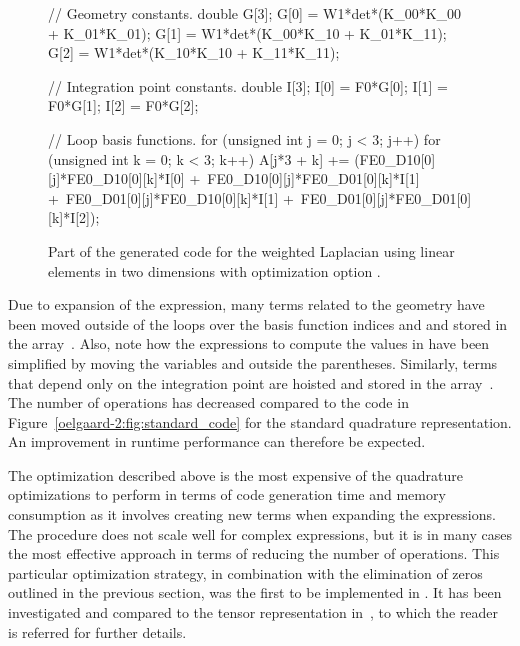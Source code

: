 \begin{figure}
\begin{c++}
// Geometry constants.
double G[3];
G[0] = W1*det*(K_00*K_00 + K_01*K_01);
G[1] = W1*det*(K_00*K_10 + K_01*K_11);
G[2] = W1*det*(K_10*K_10 + K_11*K_11);

// Integration point constants.
double I[3];
I[0] = F0*G[0];
I[1] = F0*G[1];
I[2] = F0*G[2];

// Loop basis functions.
for (unsigned int j = 0; j < 3; j++)
{
 for (unsigned int k = 0; k < 3; k++)
 {
  A[j*3 + k] += (FE0_D10[0][j]*FE0_D10[0][k]*I[0] +\
                 FE0_D10[0][j]*FE0_D01[0][k]*I[1] +\
                 FE0_D01[0][j]*FE0_D10[0][k]*I[1] +\
                 FE0_D01[0][j]*FE0_D01[0][k]*I[2]);
 }
}
\end{c++}
\caption{Part of the generated code for the weighted Laplacian using
  linear elements in two dimensions with optimization option .}
\label{oelgaard-2:fig:O_simplify_code}
\end{figure}


Due to expansion of the expression, many terms related to the geometry
have been moved outside of the loops over the basis function indices
 and  and stored in the array~.  Also, note how
the expressions to compute the values in \emp{G} have been simplified
by moving the variables \emp{det} and \emp{W1} outside the
parentheses.  Similarly, terms that depend only on the integration
point are hoisted and stored in the array~\emp{I}.  The number of
operations has decreased compared to the code in
Figure~\ref{oelgaard-2:fig:standard_code} for the standard quadrature
representation. An improvement in runtime performance can therefore be
expected.

The optimization described above is the most expensive of the
quadrature optimizations to perform in terms of \ffc{} code generation
time and memory consumption as it involves creating new terms when
expanding the expressions.  The
procedure does not scale well for complex expressions, but it is in
many cases the most effective approach in terms of reducing the number
of operations.  This particular optimization strategy, in combination
with the elimination of zeros outlined in the previous section, was
the first to be implemented in \ffc{}.  It has been investigated and
compared to the tensor representation in~\citet{OelgaardWells2010}, to
which the reader is referred for further details.

